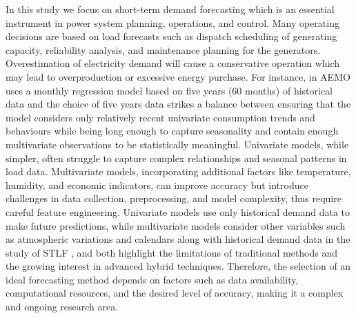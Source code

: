 \documentclass[mstat,12pt]{unswthesis}
\begin{document}
In this study we focus on short-term demand forecasting which is an
essential instrument in power system planning, operations, and control.
Many operating decisions are based on load forecasts such as dispatch
scheduling of generating capacity, reliability analysis, and maintenance
planning for the generators. Overestimation of electricity demand will
cause a conservative operation which may lead to overproduction or
excessive energy purchase. For instance, in \cite{AEMO} AEMO uses a
monthly regression model based on five years (60 months) of historical
data and the choice of five years data strikes a balance between
ensuring that the model considers only relatively recent univariate
consumption trends and behaviours while being long enough to capture
seasonality and contain enough multivariate observations to be
statistically meaningful. Univariate models, while simpler, often
struggle to capture complex relationships and seasonal patterns in load
data. Multivariate models, incorporating additional factors like
temperature, humidity, and economic indicators, can improve accuracy but
introduce challenges in data collection, preprocessing, and model
complexity, thus require careful feature engineering. Univariate models
use only historical demand data to make future predictions, while
multivariate models consider other variables such as atmospheric
variations and calendars along with historical demand data in the study
of STLF \cite{asi6060100}, \cite{wang2016review} and
\cite{chen2015electricity} both highlight the limitations of traditional
methods and the growing interest in advanced hybrid techniques.
Therefore, the selection of an ideal forecasting method depends on
factors such as data availability, computational resources, and the
desired level of accuracy, making it a complex and ongoing research
area.
\end{document}
